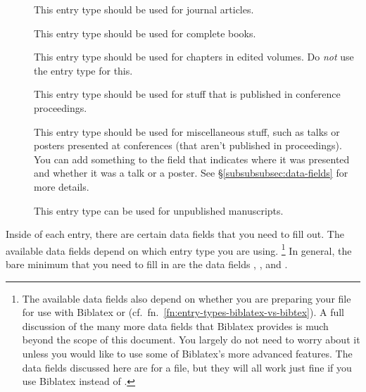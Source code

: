 \begin{description}

	\item[]{%
		This entry type should be used for journal articles.%
	}
	
	\item[]{%
		This entry type should be used for complete books.%
	}
	
	\item[]{%
		This entry type should be used for chapters in edited volumes.
		Do \emph{not} use the  entry type for this.%
	}
	
	\item[]{%
		This entry type should be used for stuff that is published in conference proceedings.%
	}
	
	\item[]{%
		This entry type should be used for miscellaneous stuff, such as talks or posters presented at conferences (that aren't published in proceedings).
		You can add something to the  field that indicates where it was presented and whether it was a talk or a poster.
		See \S\ref{subsubsubsec:data-fields} for more details.%
	}
	
	\item[]{%
		This entry type can be used for unpublished manuscripts.%
	}

\end{description}

\label{subsubsubsec:data-fields}

Inside of each entry, there are certain data fields that you need to fill out.
The available data fields depend on which entry type you are using.%
\footnote{%
The available data fields also depend on whether you are preparing your  file for use with Biblatex or  (cf.~fn.~\ref{fn:entry-types-biblatex-vs-bibtex}).
A full discussion of the many more data fields that Biblatex provides is much beyond the scope of this document.
You largely do not need to worry about it unless you would like to use some of Biblatex's more advanced features.
The data fields discussed here are for a   file, but they will all work just fine if you use Biblatex instead of .%
}
In general, the bare minimum that you need to fill in are the data fields , , and .

